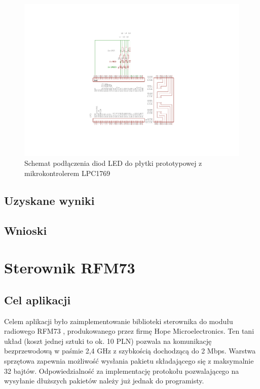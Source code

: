 \begin{figure}[h]
\centerline{\includegraphics[scale=1, clip, trim=0mm 40mm 0mm 35mm]{example_led}}
\caption{Schemat podłączenia diod LED do płytki prototypowej z mikrokontrolerem LPC1769}
\label{fig:exampleled}
\end{figure}


\subsection{Uzyskane wyniki}

\subsection{Wnioski}


\section{Sterownik RFM73}
\label{sec:przykladyRfm}

\subsection{Cel aplikacji}

Celem aplikacji było zaimplementowanie biblioteki sterownika do modułu radiowego RFM73 \cite{RFM73}, produkowanego przez firmę Hope Microelectronics.
Ten tani układ (koszt jednej sztuki to ok. 10 PLN) pozwala na komunikację bezprzewodową w paśmie 2,4 GHz z szybkością dochodzącą do 2 Mbps. Warstwa sprzętowa zapewnia możliwość wysłania pakietu składającego się z maksymalnie 32 bajtów.
Odpowiedzialność za implementację protokołu pozwalającego na wysyłanie dłuższych pakietów należy już jednak do programisty.

